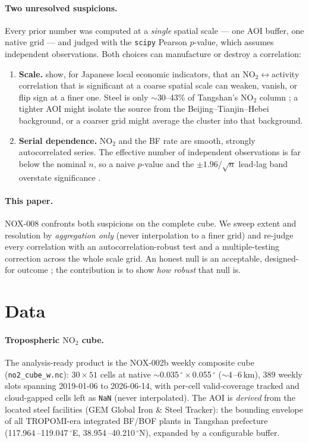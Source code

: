 \documentclass[11pt,a4paper]{article}
\providecommand{\degree}{\ensuremath{^{\circ}}}
\newcommand{\SI}[2]{#1\,#2}
\providecommand{\ce}[1]{\ensuremath{\mathrm{#1}}}
\begin{document}
\paragraph{Two unresolved suspicions.} Every prior number was computed at a \emph{single}
spatial scale --- one AOI buffer, one native grid --- and judged with the \texttt{scipy}
Pearson $p$-value, which assumes independent observations. Both choices can manufacture or
destroy a correlation:
\begin{enumerate}[leftmargin=1.4em,itemsep=0.2em]
  \item \textbf{Scale.} \citet{parubets_naito_2025} show, for Japanese local economic
  indicators, that an \ce{NO_2}$\leftrightarrow$activity correlation that is significant at a
  coarse spatial scale can weaken, vanish, or flip sign at a finer one. Steel is only
  $\sim$30--43\% of Tangshan's \ce{NO_2} column \citep{scirep_2024}; a tighter AOI might
  isolate the source from the Beijing--Tianjin--Hebei background, or a coarser grid might
  average the cluster into that background.
  \item \textbf{Serial dependence.} \ce{NO_2} and the BF rate are smooth, strongly
  autocorrelated series. The effective number of independent observations is far below the
  nominal $n$, so a naive $p$-value and the $\pm1.96/\sqrt{n}$ lead-lag band overstate
  significance \citep{morris_zhang_2019}.
\end{enumerate}

\paragraph{This paper.} NOX-008 confronts both suspicions on the complete cube. We sweep
extent and resolution by \emph{aggregation only} (never interpolation to a finer grid) and
re-judge every correlation with an autocorrelation-robust test and a multiple-testing
correction across the whole scale grid. An honest null is an acceptable, designed-for outcome
\citep{morris_zhang_2019}; the contribution is to show \emph{how robust} that null is.

\section{Data}
\label{sec:data}

\paragraph{Tropospheric \ce{NO_2} cube.} The analysis-ready product is the NOX-002b weekly
composite cube (\texttt{no2\_cube\_w.nc}): $30\times51$ cells at native
$\sim$\SI{0.035}{\degree}\,$\times$\,\SI{0.055}{\degree} ($\sim$\SI{4}{}--\SI{6}{km}),
$389$ weekly slots spanning 2019-01-06 to 2026-06-14, with per-cell valid-coverage tracked
and cloud-gapped cells left as \texttt{NaN} (never interpolated). The AOI is \emph{derived}
from the located steel facilities (GEM Global Iron \& Steel Tracker): the bounding envelope
of all TROPOMI-era integrated BF/BOF plants in Tangshan prefecture
(\SI{117.964}{}--\SI{119.047}{\degree}E, \SI{38.954}{}--\SI{40.210}{\degree}N), expanded by a
configurable buffer.
\end{document}
